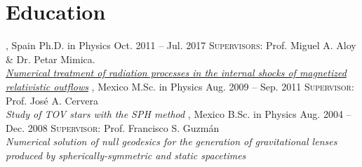 \section{Education}

%
{\UVval, Spain}%
{Ph.D. in Physics}%
{Oct. 2011 -- Jul. 2017}%
{}%
{\textsc{Supervisors}: Prof. Miguel A. Aloy \& Dr. Petar Mimica.\\%
  \href{http://roderic.uv.es/handle/10550/60003}{\textit{Numerical treatment of radiation processes in the internal shocks of magnetized relativistic outflows}}
}
\cventry{}%
{\UMSNHes, Mexico}%
{M.Sc. in Physics}%
{Aug. 2009 -- Sep. 2011}%
{}%
{\textsc{Supervisor}: Prof. José A. Cervera\\%
  \textit{Study of TOV stars with the SPH method}
}
\cventry{}%
{\UAEMes, Mexico}%
{B.Sc. in Physics}%
{Aug. 2004 -- Dec. 2008}
{}%
{\textsc{Supervisor}: Prof. Francisco S. Guzmán\\%
  \textit{Numerical solution of null geodesics for the generation of gravitational lenses produced by spherically-symmetric and static spacetimes}
}
